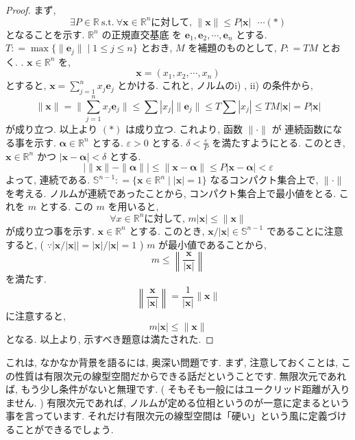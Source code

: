\documentclass[dvipdfmx,uplatex,11pt]{jsarticle}
\theoremstyle{definition}
\begin{document}
\begin{leftbar}
\begin{proof}
	まず, 
%		
		\[
			\exists P \in \mathbb R \ \mathrm{s.t.} \ \forall \bm x \in \mathbb R^n \text {に対して, } \| \bm x \| \leq P | \bm x | \ \ \ \cdots ( \ast )
		\]
%		
	となることを示す. $\mathbb R^n$ の正規直交基底 を $\bm e_1 , \bm e_2 , \cdots , \bm e_n$ とする. $T : = \max \{ \| \bm e_j \| \mid 1 \leq j \leq n \}$ とおき, $M$ を補題のものとして, $P : = TM$ とおく. . $\bm x \in \mathbb R ^n$ を, 
%		
		\[
			\bm x = ( x_1 , x_2 , \cdots , x_n )
		\]
%		
	とすると, $\bm x = \sum_{j=1} ^ n x_j \bm e_j$ とかける. これと, ノルムのi) , ii) の条件から, 
%		
		\[
			\| \bm x \| = \| \sum_{j=1} ^ n x_j \bm e_j \| \leq \sum | x_j | \| \bm e_j \| \leq T \sum | x_j | \leq T M | \bm x | = P | \bm x |
		\]
%		
	が成り立つ. 以上より $( \ast )$ は成り立つ. これより, 函数 $\| \cdot \|$ が 連続函数になる事を示す. $\bm \alpha \in \mathbb R^n$ とする. $\varepsilon > 0$ とする. $\delta < \frac {\varepsilon} {P}$ を満たすようにとる. このとき, 
	$\bm x \in \mathbb R^n$ かつ $| \bm x - \bm \alpha | < \delta$ とする. 
%		
		\[
			| \| \bm x \| - \| \bm \alpha \| | \leq \| \bm x - \bm \alpha \| \leq P | \bm x - \bm \alpha | < \varepsilon
		\] 
%		
	よって, 連続である.  $\mathbb S^{n-1} : =\{ \bm x \in \mathbb R^n \mid | \bm x | = 1 \}$ なるコンパクト集合上で, $\| \cdot \|$ を考える. ノルムが連続であったことから, コンパクト集合上で最小値をとる. これを $m$ とする. この 
	$m$ を用いると, 
%		
		\[
			\forall x \in \mathbb R^n \text {に対して, } m | \bm x | \leq \| \bm x \|
		\]
%		
	が成り立つ事を示す. $\bm x \in \mathbb R^n$ とする. このとき, $\bm x / | \bm x | \in \mathbb S^{n-1}$ であることに注意すると, ( $\because | \bm x / | \bm x | | = | \bm x | / | \bm x | = 1 $ ) $m$ が最小値であることから, 
%		
		\[
			m \leq \left \| \frac {\bm x} {| \bm x |} \right \|
		\]
%		
	を満たす. 
%		
		\[
			\left \| \frac {\bm x} {| \bm x |} \right \| = \frac {1} {| \bm x |} \| \bm x \|
		\]
%		
	に注意すると, 
%		
		\[
			m | \bm x | \leq \| \bm x \|
		\]
%		
	となる. 以上より, 示すべき題意は満たされた.	
\end{proof}
\end{leftbar}
これは, なかなか背景を語るには, 奥深い問題です. まず, 注意しておくことは, この性質は有限次元の線型空間だからできる話だということです. 無限次元であれば, もう少し条件がないと無理です. ( そもそも一般にはユークリッド距離が入りません. ) 有限次元であれば, ノルムが定める位相というのが一意に定まるという事を言っています. それだけ有限次元の線型空間は「硬い」という風に定義づけることができるでしょう. \par
\end{document}

